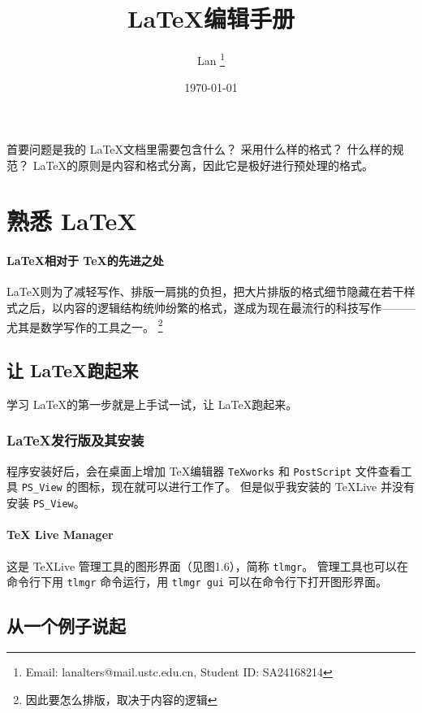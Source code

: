 \documentclass[UTF8]{ctexart} %
\title{\LaTeX 编辑手册}
\author[1,2]{Lan \footnote{Email: lanalters@mail.ustc.edu.cn, Student ID: SA24168214}}
\affil[1]{中国科学技术大学, 合肥 230026}
\affil[2]{中国科学院合肥物质科学研究院\,等离子体物理研究所, 合肥 230031}
\date{\today}
\begin{document}
\maketitle
\tableofcontents


首要问题是我的 \LaTeX 文档里需要包含什么？
采用什么样的格式？
什么样的规范？
\LaTeX 的原则是内容和格式分离，因此它是极好进行预处理的格式。

\section{熟悉 LaTeX}
\label{sec:熟悉LaTeX}

\paragraph{\LaTeX 相对于 \TeX 的先进之处}

\LaTeX 则为了减轻写作、排版一肩挑的负担，把大片排版的格式细节隐藏在若干样式之后，以内容的逻辑结构统帅纷繁的格式，遂成为现在最流行的科技写作———尤其是数学写作的工具之一。
\footnote{因此要怎么排版，取决于内容的逻辑}

\subsection{让 \LaTeX 跑起来}
\label{sub:让LaTeX跑起来}

学习 \LaTeX 的第一步就是上手试一试，让 \LaTeX 跑起来。

\subsubsection{\LaTeX 发行版及其安装}
\label{subsub:LaTeX发行版及其安装}

程序安装好后，会在桌面上增加 \TeX 编辑器 \verb|TeXworks| 和 \verb|PostScript| 文件查看工具 \verb|PS_View| 的图标，现在就可以进行工作了。
但是似乎我安装的 \TeX Live 并没有安装 \verb|PS_View|。

\paragraph{TeX Live Manager}
\label{par:TeX Live Manager}

这是 \TeX Live 管理工具的图形界面（见图1.6），简称 \verb|tlmgr|。
管理工具也可以在命令行下用 \verb|tlmgr| 命令运行，用 \verb|tlmgr gui| 可以在命令行下打开图形界面。

\subsection{从一个例子说起}
\label{sub:从一个例子说起}
\end{document}
